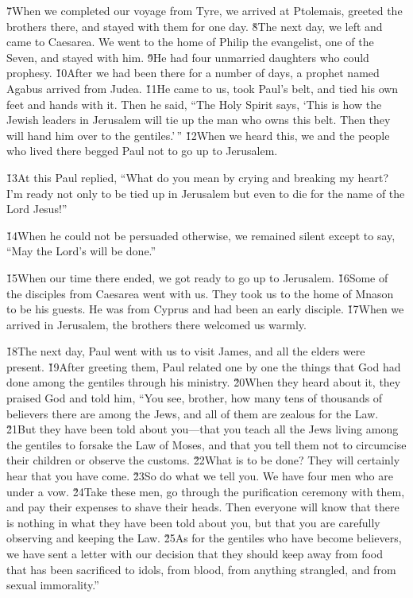 \v{7}When we completed our voyage from Tyre, we arrived at Ptolemais, greeted the brothers there, and stayed with them for one day. \v{8}The next day, we left and came to Caesarea. We went to the home of Philip the evangelist, one of the Seven, and stayed with him. \v{9}He had four unmarried daughters who could prophesy. \v{10}After we had been there for a number of days, a prophet named Agabus arrived from Judea. \v{11}He came to us, took Paul's belt, and tied his own feet and hands with it. Then he said, ``The Holy Spirit says, `This is how the Jewish leaders in Jerusalem will tie up the man who owns this belt. Then they will hand him over to the gentiles.'\,'' \v{12}When we heard this, we and the people who lived there begged Paul not to go up to Jerusalem.

\v{13}At this Paul replied, ``What do you mean by crying and breaking my heart? I'm ready not only to be tied up in Jerusalem but even to die for the name of the Lord Jesus!''

\v{14}When he could not be persuaded otherwise, we remained silent except to say, ``May the Lord's will be done.''

\v{15}When our time there ended, we got ready to go up to Jerusalem. \v{16}Some of the disciples from Caesarea went with us. They took us to the home of Mnason to be his guests. He was from Cyprus and had been an early disciple. \v{17}When we arrived in Jerusalem, the brothers there welcomed us warmly.

\v{18}The next day, Paul went with us to visit James, and all the elders were present. \v{19}After greeting them, Paul related one by one the things that God had done among the gentiles through his ministry. \v{20}When they heard about it, they praised God and told him, ``You see, brother, how many tens of thousands of believers there are among the Jews, and all of them are zealous for the Law. \v{21}But they have been told about you---that you teach all the Jews living among the gentiles to forsake the Law of Moses, and that you tell them not to circumcise their children or observe the customs. \v{22}What is to be done? They will certainly hear that you have come. \v{23}So do what we tell you. We have four men who are under a vow. \v{24}Take these men, go through the purification ceremony with them, and pay their expenses to shave their heads. Then everyone will know that there is nothing in what they have been told about you, but that you are carefully observing and keeping the Law. \v{25}As for the gentiles who have become believers, we have sent a letter with our decision that they should keep away from food that has been sacrificed to idols, from blood, from anything strangled, and from sexual immorality.''

